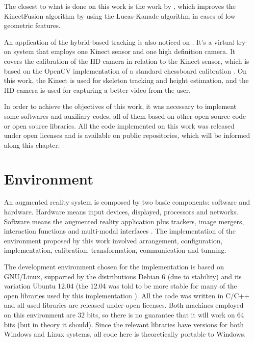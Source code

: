 \documentclass[msc, a4paper, classic, en]{ufbathesis}
\begin{document}
The closest to what is done on this work is the work by \cite{kinectkanade}, which improves the KinectFusion algorithm by using the Lucas-Kanade algorithm in cases of low geometric features.

An application of the hybrid-based tracking is also noticed on \cite{tryon}. It's a virtual try-on system that employs one Kinect sensor and one high definition camera. It covers the calibration of the HD camera in relation to the Kinect sensor, which is based on the OpenCV implementation of a standard chessboard calibration \cite{matlab}. On this work, the Kinect is used for skeleton tracking and height estimation, and the HD camera is used for capturing a better video from the user.


In order to achieve the objectives of this work, it was necessary to implement some softwares and auxiliary codes, all of them based on other open source code or open source libraries. All the code implemented on this work was released under open licenses and is available on public repositories, which will be informed along this chapter.

\section{Environment}
\label{sec:env}

An augmented reality system is composed by two basic components: software and hardware. Hardware means input devices, displayed, processors and networks. Software means the augmented reality application plus trackers, image mergers, interaction functions and multi-modal interfaces \cite{tori2006fundamentos}. The implementation of the environment proposed by this work involved arrangement, configuration, implementation, calibration, transformation, communication and tunning.

The development environment chosen for the implementation is based on GNU/Linux, supported by the distributions Debian 6 (due to stability) and its variation Ubuntu 12.04 (the 12.04 was told to be more stable for many of the open libraries used by this implementation \cite{pcl14}). All the code was written in C/C++ and all used libraries are released under open licenses. Both machines employed on this environment are 32 bits, so there is no guarantee that it will work on 64 bits (but in theory it should). Since the relevant libraries have versions for both Windows and Linux systems, all code here is theoretically portable to Windows.
\end{document}
